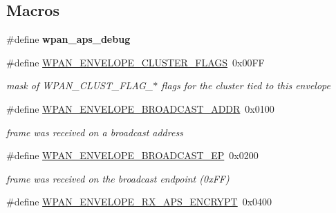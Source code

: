 \subsection*{Macros}
\begin{DoxyCompactItemize}
\item 
\mbox{\label{group__wpan__aps_gabb1c4414656c0126916692f8c93495bc}} 
\#define {\bfseries wpan\+\_\+aps\+\_\+debug}
\item 
\mbox{\label{group__wpan__aps_ga6a6e8a32dc7117f44bdca2802a1e54aa}} 
\#define \hyperlink{group__wpan__aps_ga6a6e8a32dc7117f44bdca2802a1e54aa}{W\+P\+A\+N\+\_\+\+E\+N\+V\+E\+L\+O\+P\+E\+\_\+\+C\+L\+U\+S\+T\+E\+R\+\_\+\+F\+L\+A\+GS}~0x00\+FF
\begin{DoxyCompactList}\small\item\em mask of W\+P\+A\+N\+\_\+\+C\+L\+U\+S\+T\+\_\+\+F\+L\+A\+G\+\_\+$\ast$ flags for the cluster tied to this envelope \end{DoxyCompactList}\item 
\mbox{\label{group__wpan__aps_ga92a0f27267b04aa691e184b428e8f7c6}} 
\#define \hyperlink{group__wpan__aps_ga92a0f27267b04aa691e184b428e8f7c6}{W\+P\+A\+N\+\_\+\+E\+N\+V\+E\+L\+O\+P\+E\+\_\+\+B\+R\+O\+A\+D\+C\+A\+S\+T\+\_\+\+A\+D\+DR}~0x0100
\begin{DoxyCompactList}\small\item\em frame was received on a broadcast address \end{DoxyCompactList}\item 
\mbox{\label{group__wpan__aps_ga9572c340b083c6a51b0473fee184ea2c}} 
\#define \hyperlink{group__wpan__aps_ga9572c340b083c6a51b0473fee184ea2c}{W\+P\+A\+N\+\_\+\+E\+N\+V\+E\+L\+O\+P\+E\+\_\+\+B\+R\+O\+A\+D\+C\+A\+S\+T\+\_\+\+EP}~0x0200
\begin{DoxyCompactList}\small\item\em frame was received on the broadcast endpoint (0x\+FF) \end{DoxyCompactList}\item 
\mbox{\label{group__wpan__aps_ga3bf12c3b9fd0afac2c9f58de8e7c38e9}} 
\#define \hyperlink{group__wpan__aps_ga3bf12c3b9fd0afac2c9f58de8e7c38e9}{W\+P\+A\+N\+\_\+\+E\+N\+V\+E\+L\+O\+P\+E\+\_\+\+R\+X\+\_\+\+A\+P\+S\+\_\+\+E\+N\+C\+R\+Y\+PT}~0x0400

\end{DoxyCompactItemize}
